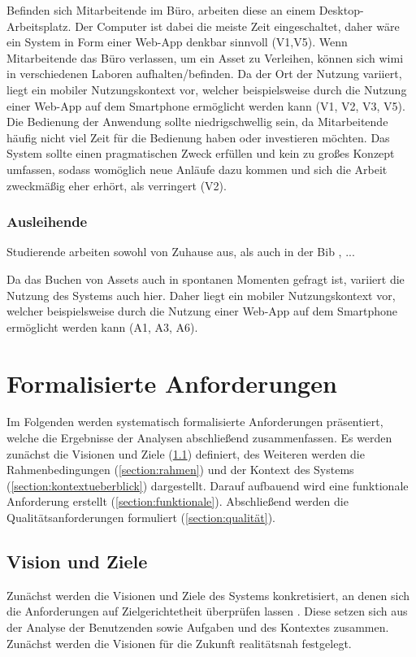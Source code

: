 Befinden sich Mitarbeitende im Büro, arbeiten diese an einem Desktop-Arbeitsplatz. Der Computer ist
dabei die meiste Zeit eingeschaltet, daher wäre ein System in Form einer Web-App denkbar sinnvoll
(V1,V5). Wenn Mitarbeitende das Büro verlassen, um ein Asset zu Verleihen, können sich \ac{wimi} in
verschiedenen Laboren aufhalten/befinden. Da der Ort der Nutzung variiert, liegt ein mobiler
Nutzungskontext vor, welcher beispielsweise durch die Nutzung einer Web-App auf dem Smartphone
ermöglicht werden kann (V1, V2, V3, V5). Die Bedienung der Anwendung sollte niedrigschwellig sein,
da Mitarbeitende häufig nicht viel Zeit für die Bedienung haben oder investieren möchten. Das System
sollte einen pragmatischen Zweck erfüllen und kein zu großes Konzept umfassen, sodass womöglich neue
Anläufe dazu kommen und sich die Arbeit zweckmäßig eher erhört, als verringert (V2).

\subsubsection{Ausleihende}
Studierende arbeiten sowohl von Zuhause aus, als auch in der Bib , ... 

Da das Buchen von Assets auch in spontanen Momenten gefragt ist, variiert die Nutzung des Systems
auch hier. Daher liegt ein mobiler Nutzungskontext vor, welcher beispielsweise durch die Nutzung
einer Web-App auf dem Smartphone ermöglicht werden kann (A1, A3, A6).


\section{Formalisierte Anforderungen}
\label{section:anforderung}

Im Folgenden werden systematisch formalisierte Anforderungen präsentiert, welche die Ergebnisse der
Analysen abschließend zusammenfassen. Es werden zunächst die Visionen und Ziele
(\ref{section:visionziel}) definiert, des Weiteren werden die Rahmenbedingungen
(\ref{section:rahmen}) und der Kontext des Systems (\ref{section:kontextueberblick}) dargestellt.
Darauf aufbauend wird eine funktionale Anforderung erstellt (\ref{section:funktionale}).
Abschließend werden die Qualitätsanforderungen formuliert (\ref{section:qualität}).


\subsection{Vision und Ziele}
\label{section:visionziel}
Zunächst werden die Visionen und Ziele des Systems konkretisiert, an denen sich die Anforderungen
auf Zielgerichtetheit überprüfen lassen \cite{balzert2009}. Diese setzen sich aus der Analyse der
Benutzenden sowie Aufgaben und des Kontextes zusammen. Zunächst werden die Visionen für die Zukunft
realitätsnah festgelegt.

